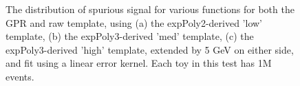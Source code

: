 \begin{figure} 
\begin{center}

\caption{The distribution of spurious signal for various functions for both the GPR and raw template, using (a) the expPoly2-derived 'low' template, (b) the expPoly3-derived 'med' template, (c) the expPoly3-derived 'high' template, extended by 5 GeV on either side, and fit using a linear error kernel. Each toy in this test has 1M events.}
\label{fig:linearkernel_lowpt_1M_noSig}
\end{center}
\end{figure}

